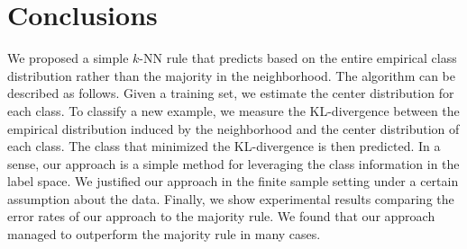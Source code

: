 \documentclass{article}
\begin{document}
\section{Conclusions}
\label{sec:conclusion}
We proposed a simple $k$-NN rule that predicts based on the entire
empirical class distribution rather than the majority in the
neighborhood. The algorithm can be described as follows. Given a
training set, we estimate the center distribution for each class. To
classify a new example, we measure the KL-divergence between the
empirical distribution induced by the neighborhood and the center
distribution of each class. The class that minimized the KL-divergence
is then predicted. In a sense, our approach is a simple method for
leveraging the class information in the label space.  We justified our
approach in the finite sample setting under a certain assumption about
the data. Finally, we show experimental results comparing the error
rates of our approach to the majority rule. We found that our approach
managed to outperform the majority rule in many cases.



\end{document}
